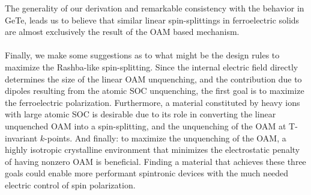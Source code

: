 The generality of our derivation and remarkable consistency with the behavior in GeTe, leads us to believe that similar linear spin-splittings in ferroelectric solids are almost exclusively the result of the OAM based mechanism.
\\\\
Finally, we make some suggestions as to what might be the design rules to maximize the Rashba-like spin-splitting.
Since the internal electric field directly determines the size of the linear OAM unquenching, and the contribution due to dipoles resulting from the atomic SOC unquenching, the first goal is to maximize the ferroelectric polarization.
Furthermore, a material constituted by heavy ions with large atomic SOC is desirable due to its role in converting the linear unquenched OAM into a spin-splitting, and the unquenching of the OAM at T-invariant $k$-points.
And finally: to maximize the unquenching of the OAM, a highly isotropic crystalline environment that minimizes the electrostatic penalty of having nonzero OAM is beneficial.
Finding a material that achieves these three goals could enable more performant spintronic devices with the much needed electric control of spin polarization.
